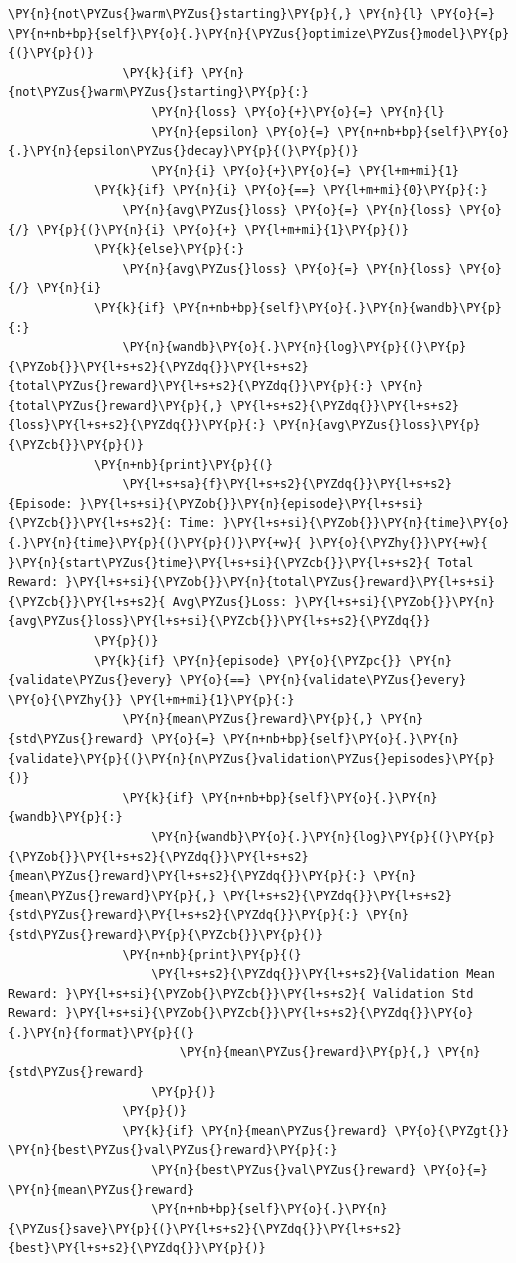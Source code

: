 \documentclass{article}
\begin{document}
\begin{Verbatim}[commandchars=\\\{\}]
                \PY{n}{not\PYZus{}warm\PYZus{}starting}\PY{p}{,} \PY{n}{l} \PY{o}{=} \PY{n+nb+bp}{self}\PY{o}{.}\PY{n}{\PYZus{}optimize\PYZus{}model}\PY{p}{(}\PY{p}{)}
                \PY{k}{if} \PY{n}{not\PYZus{}warm\PYZus{}starting}\PY{p}{:}
                    \PY{n}{loss} \PY{o}{+}\PY{o}{=} \PY{n}{l}
                    \PY{n}{epsilon} \PY{o}{=} \PY{n+nb+bp}{self}\PY{o}{.}\PY{n}{epsilon\PYZus{}decay}\PY{p}{(}\PY{p}{)}
                    \PY{n}{i} \PY{o}{+}\PY{o}{=} \PY{l+m+mi}{1}
            \PY{k}{if} \PY{n}{i} \PY{o}{==} \PY{l+m+mi}{0}\PY{p}{:}
                \PY{n}{avg\PYZus{}loss} \PY{o}{=} \PY{n}{loss} \PY{o}{/} \PY{p}{(}\PY{n}{i} \PY{o}{+} \PY{l+m+mi}{1}\PY{p}{)}
            \PY{k}{else}\PY{p}{:}
                \PY{n}{avg\PYZus{}loss} \PY{o}{=} \PY{n}{loss} \PY{o}{/} \PY{n}{i}
            \PY{k}{if} \PY{n+nb+bp}{self}\PY{o}{.}\PY{n}{wandb}\PY{p}{:}
                \PY{n}{wandb}\PY{o}{.}\PY{n}{log}\PY{p}{(}\PY{p}{\PYZob{}}\PY{l+s+s2}{\PYZdq{}}\PY{l+s+s2}{total\PYZus{}reward}\PY{l+s+s2}{\PYZdq{}}\PY{p}{:} \PY{n}{total\PYZus{}reward}\PY{p}{,} \PY{l+s+s2}{\PYZdq{}}\PY{l+s+s2}{loss}\PY{l+s+s2}{\PYZdq{}}\PY{p}{:} \PY{n}{avg\PYZus{}loss}\PY{p}{\PYZcb{}}\PY{p}{)}
            \PY{n+nb}{print}\PY{p}{(}
                \PY{l+s+sa}{f}\PY{l+s+s2}{\PYZdq{}}\PY{l+s+s2}{Episode: }\PY{l+s+si}{\PYZob{}}\PY{n}{episode}\PY{l+s+si}{\PYZcb{}}\PY{l+s+s2}{: Time: }\PY{l+s+si}{\PYZob{}}\PY{n}{time}\PY{o}{.}\PY{n}{time}\PY{p}{(}\PY{p}{)}\PY{+w}{ }\PY{o}{\PYZhy{}}\PY{+w}{ }\PY{n}{start\PYZus{}time}\PY{l+s+si}{\PYZcb{}}\PY{l+s+s2}{ Total Reward: }\PY{l+s+si}{\PYZob{}}\PY{n}{total\PYZus{}reward}\PY{l+s+si}{\PYZcb{}}\PY{l+s+s2}{ Avg\PYZus{}Loss: }\PY{l+s+si}{\PYZob{}}\PY{n}{avg\PYZus{}loss}\PY{l+s+si}{\PYZcb{}}\PY{l+s+s2}{\PYZdq{}}
            \PY{p}{)}
            \PY{k}{if} \PY{n}{episode} \PY{o}{\PYZpc{}} \PY{n}{validate\PYZus{}every} \PY{o}{==} \PY{n}{validate\PYZus{}every} \PY{o}{\PYZhy{}} \PY{l+m+mi}{1}\PY{p}{:}
                \PY{n}{mean\PYZus{}reward}\PY{p}{,} \PY{n}{std\PYZus{}reward} \PY{o}{=} \PY{n+nb+bp}{self}\PY{o}{.}\PY{n}{validate}\PY{p}{(}\PY{n}{n\PYZus{}validation\PYZus{}episodes}\PY{p}{)}
                \PY{k}{if} \PY{n+nb+bp}{self}\PY{o}{.}\PY{n}{wandb}\PY{p}{:}
                    \PY{n}{wandb}\PY{o}{.}\PY{n}{log}\PY{p}{(}\PY{p}{\PYZob{}}\PY{l+s+s2}{\PYZdq{}}\PY{l+s+s2}{mean\PYZus{}reward}\PY{l+s+s2}{\PYZdq{}}\PY{p}{:} \PY{n}{mean\PYZus{}reward}\PY{p}{,} \PY{l+s+s2}{\PYZdq{}}\PY{l+s+s2}{std\PYZus{}reward}\PY{l+s+s2}{\PYZdq{}}\PY{p}{:} \PY{n}{std\PYZus{}reward}\PY{p}{\PYZcb{}}\PY{p}{)}
                \PY{n+nb}{print}\PY{p}{(}
                    \PY{l+s+s2}{\PYZdq{}}\PY{l+s+s2}{Validation Mean Reward: }\PY{l+s+si}{\PYZob{}\PYZcb{}}\PY{l+s+s2}{ Validation Std Reward: }\PY{l+s+si}{\PYZob{}\PYZcb{}}\PY{l+s+s2}{\PYZdq{}}\PY{o}{.}\PY{n}{format}\PY{p}{(}
                        \PY{n}{mean\PYZus{}reward}\PY{p}{,} \PY{n}{std\PYZus{}reward}
                    \PY{p}{)}
                \PY{p}{)}
                \PY{k}{if} \PY{n}{mean\PYZus{}reward} \PY{o}{\PYZgt{}} \PY{n}{best\PYZus{}val\PYZus{}reward}\PY{p}{:}
                    \PY{n}{best\PYZus{}val\PYZus{}reward} \PY{o}{=} \PY{n}{mean\PYZus{}reward}
                    \PY{n+nb+bp}{self}\PY{o}{.}\PY{n}{\PYZus{}save}\PY{p}{(}\PY{l+s+s2}{\PYZdq{}}\PY{l+s+s2}{best}\PY{l+s+s2}{\PYZdq{}}\PY{p}{)}


\end{Verbatim}
\end{document}

